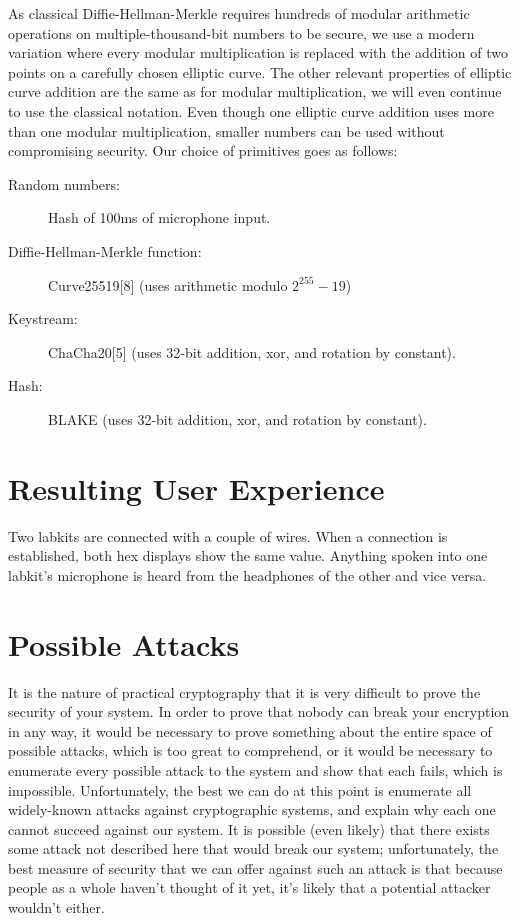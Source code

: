 \documentclass[a4paper]{report}
\begin{document}
As classical Diffie-Hellman-Merkle requires hundreds of modular arithmetic operations
on multiple-thousand-bit numbers to be secure, we use a modern
variation where every modular multiplication is replaced with the addition of
two points on a carefully chosen elliptic curve. The other relevant properties
of elliptic curve addition are the same as for modular multiplication, we will %
even continue to use the classical notation. Even though one elliptic curve
addition uses more than one modular multiplication, smaller numbers can be used
without compromising security. Our choice of primitives goes as follows:

\begin{description}
  \item[Random numbers:] Hash of 100ms of microphone input.
  \item[Diffie-Hellman-Merkle function:] Curve25519[8] (uses arithmetic modulo $2^{255}-19$)
  \item[Keystream:] ChaCha20[5] (uses 32-bit addition, xor, and rotation by constant).
  \item[Hash:] BLAKE (uses 32-bit addition, xor, and rotation by constant).
\end{description}

\section{Resulting User Experience}

Two labkits are connected with a couple of wires. When a connection is
established, both hex displays show the same value. Anything spoken into one
labkit's microphone is heard from the headphones of the other and vice versa.

\section{Possible Attacks}

It is the nature of practical cryptography that it is very difficult to prove the security of your system. In order to prove that nobody can break your encryption in any way, it would be necessary to prove something about the entire space of possible attacks, which is too great to comprehend, or it would be necessary to enumerate every possible attack to the system and show that each fails, which is impossible. Unfortunately, the best we can do at this point is enumerate all widely-known attacks against cryptographic systems, and explain why each one cannot succeed against our system. It is possible (even likely) that there exists some attack not described here that would break our system; unfortunately, the best measure of security that we can offer against such an attack is that because people as a whole haven't thought of it yet, it's likely that a potential attacker wouldn't either.
\end{document}

